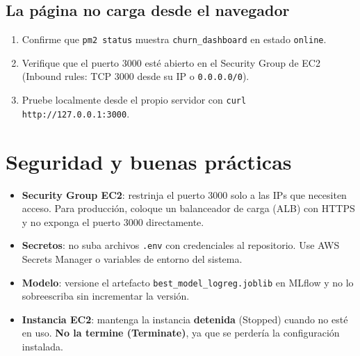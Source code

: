 \documentclass[11pt]{article}
\begin{document}
\subsection{La página no carga desde el navegador}

\begin{enumerate}[itemsep=2pt]
  \item Confirme que \texttt{pm2 status} muestra \texttt{churn\_dashboard}
        en estado \texttt{online}.
  \item Verifique que el puerto 3000 esté abierto en el Security Group de EC2
        (Inbound rules: TCP 3000 desde su IP o \texttt{0.0.0.0/0}).
  \item Pruebe localmente desde el propio servidor con
        \texttt{curl http://127.0.0.1:3000}.
\end{enumerate}

\section{Seguridad y buenas prácticas}

\begin{itemize}[itemsep=4pt]
  \item \textbf{Security Group EC2}: restrinja el puerto 3000 solo a las IPs
        que necesiten acceso. Para producción, coloque un balanceador de carga
        (ALB) con HTTPS y no exponga el puerto 3000 directamente.
  \item \textbf{Secretos}: no suba archivos \texttt{.env} con credenciales al
        repositorio. Use AWS Secrets Manager o variables de entorno del sistema.
  \item \textbf{Modelo}: versione el artefacto \texttt{best\_model\_logreg.joblib}
        en MLflow y no lo sobreescriba sin incrementar la versión.
  \item \textbf{Instancia EC2}: mantenga la instancia \textbf{detenida}
        (Stopped) cuando no esté en uso. \textbf{No la termine (Terminate)},
        ya que se perdería la configuración instalada.
\end{itemize}
\end{document}
